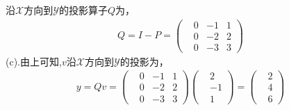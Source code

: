 \documentclass[UTF8,12pt, a4paper]{ctexart}
\begin{document}
沿$\mathcal{X}$方向到$\mathcal{Y}$的投影算子$Q$为，
\begin{align*}
  Q=I-P= 
  \left(
    \begin{matrix}
      &0 & -1 & 1 \\
      &0 & -2 & 2 \\
      &0 & -3 & 3
    \end{matrix}
  \right) 
\end{align*}
(c).由上可知,$v$沿$\mathcal{X}$方向到$\mathcal{Y}$的投影为，
\begin{align*}
  y=Qv=
  \left(
    \begin{matrix}
      &0 & -1 & 1 \\
      &0 & -2 & 2 \\
      &0 & -3 & 3
    \end{matrix}
  \right) 
  \left(
    \begin{matrix}
      &2 \\
      &-1 \\
      &1
    \end{matrix}
  \right) = 
  \left(
    \begin{matrix}
      &2 \\
      &4 \\
      &6
    \end{matrix}
  \right) 
\end{align*}
\end{document}
